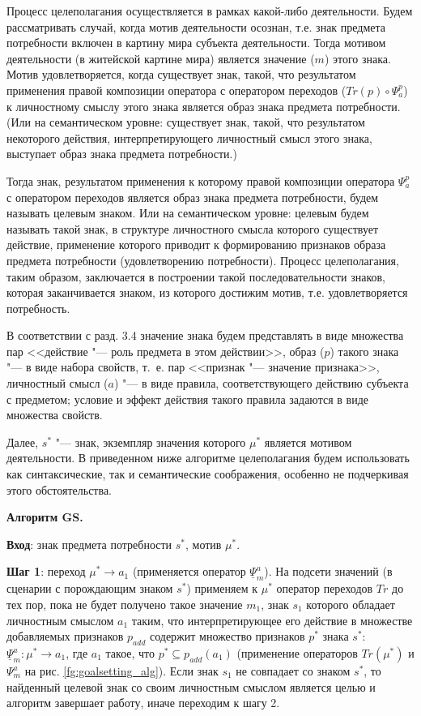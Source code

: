 Процесс целеполагания осуществляется в рамках какой-либо деятельности. Будем рассматривать случай, когда мотив деятельности осознан, т.е. знак предмета потребности включен в картину мира субъекта деятельности. Тогда мотивом деятельности (в житейской картине мира) является значение ($m$) этого знака. Мотив удовлетворяется, когда существует знак, такой, что результатом применения правой композиции оператора   с оператором переходов ($Tr(p)\circ\Psi_a^p$) к личностному смыслу этого знака является образ знака предмета потребности. (Или на семантическом уровне: существует знак, такой, что результатом некоторого действия, интерпретирующего личностный смысл этого знака, выступает образ знака предмета потребности.)

Тогда знак, результатом применения к которому правой композиции оператора $\Psi_a^p$ с оператором переходов является образ знака предмета потребности, будем называть целевым знаком. Или на семантическом уровне: целевым будем называть такой знак, в структуре личностного смысла которого существует действие, применение которого приводит к формированию признаков образа предмета потребности (удовлетворению потребности). Процесс целеполагания, таким образом, заключается в построении такой последовательности знаков, которая заканчивается знаком, из которого достижим мотив, т.е. удовлетворяется потребность.

В соответствии с разд. 3.4 значение знака будем представлять в виде множества пар <<действие "--- роль предмета в этом действии>>, образ ($p$) такого знака "--- в виде набора свойств, т.~е. пар <<признак "--- значение признака>>, личностный смысл ($a$) "--- в виде правила, соответствующего действию субъекта с предметом; условие и эффект действия такого правила задаются в виде множества свойств.

Далее, $s^*$ "--- знак, экземпляр значения которого $\mu^*$ является мотивом деятельности. В приведенном ниже алгоритме целеполагания будем использовать как синтаксические, так и семантические соображения, особенно не подчеркивая этого обстоятельства.

\textbf{Алгоритм GS.}

\textbf{Вход}: знак предмета потребности $s^*$, мотив $\mu^*$.

\textbf{Шаг 1}: переход $\mu^*\rightarrow a_1$ (применяется оператор $\underline{\Psi}_m^a$). На подсети значений (в сценарии с порождающим знаком $s^*$) применяем к $\mu^*$ оператор переходов $Tr$ до тех пор, пока не будет получено такое значение $m_1$, знак $s_1$ которого обладает личностным смыслом $a_1$ таким, что интерпретирующее его действие в множестве добавляемых признаков $p_{add}$ содержит множество признаков $p^*$ знака $s^*$:  $\underline{\Psi}_m^a:\mu^*\rightarrow a_1$, где $a_1$ такое, что $p^*\subseteq p_{add}(a_1)$ (применение операторов $Tr(\mu^*)$ и $\Psi_m^a$ на рис. \ref{fg:goalsetting_alg}). Если знак $s_1$ не совпадает со знаком $s^*$, то найденный целевой знак со своим личностным смыслом является целью и алгоритм завершает работу, иначе переходим к шагу 2.

